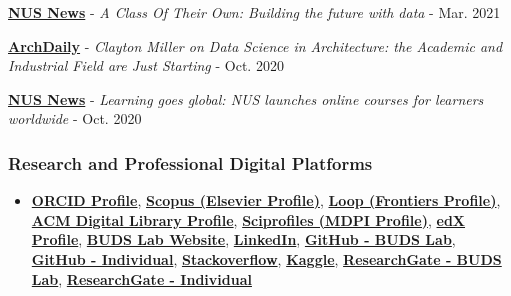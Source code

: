 \documentclass[10pt,a4paper]{article}
\begin{document}
\begin{small}
\begin{etaremune}
\item
\textbf{\href{https://news.nus.edu.sg/a-class-of-their-own-building-the-future-with-data/}{NUS News}} - \emph{A Class Of Their Own: Building the future with data} - Mar. 2021
\item
\textbf{\href{https://www.archdaily.com/948970/clayton-miller-on-data-science-in-architecture-academic-and-industry-are-just-starting}{ArchDaily}} - \emph{Clayton Miller on Data Science in Architecture: the Academic and Industrial Field are Just Starting} - Oct. 2020
\item
\textbf{\href{https://news.nus.edu.sg/learning-goes-global-nus-launches-online-courses-for-learners-worldwide/}{NUS News}} - \emph{Learning goes global: NUS launches online courses for learners worldwide} - Oct. 2020
\end{etaremune}

\subsubsection*{Research and Professional Digital Platforms}
\begin{itemize}
\item \href{https://orcid.org/0000-0002-1186-4299}{\textbf{ORCID Profile}}, \href{https://www.scopus.com/authid/detail.uri?authorId=55907251600}{\textbf{Scopus (Elsevier Profile)}}, \href{https://loop.frontiersin.org/people/416324/}{\textbf{Loop (Frontiers Profile)}}, \href{https://dl.acm.org/profile/99658969123}{\textbf{ACM Digital Library Profile}}, \href{https://sciprofiles.com/profile/477138}{\textbf{Sciprofiles (MDPI Profile)}}, \href{https://www.edx.org/bio/clayton-miller}{\textbf{edX Profile}}, \href{https://budslab.org/}{\textbf{BUDS Lab Website}}, \href{https://www.linkedin.com/in/claytonmiller/}{\textbf{LinkedIn}}, \href{https://github.com/buds-lab}{\textbf{GitHub - BUDS Lab}}, \href{https://github.com/cmiller8}{\textbf{GitHub - Individual}}, \href{https://stackoverflow.com/users/655733/clayton}{\textbf{Stackoverflow}}, \href{https://www.kaggle.com/claytonmiller}{\textbf{Kaggle}}, \href{https://www.researchgate.net/lab/Building-and-Urban-Data-Science-BUDS-Lab-Clayton-Miller}{\textbf{ResearchGate - BUDS Lab}}, \href{https://www.researchgate.net/profile/Clayton-Miller-4}{\textbf{ResearchGate - Individual}} 
\end{itemize}



\end{small}
\end{document}
